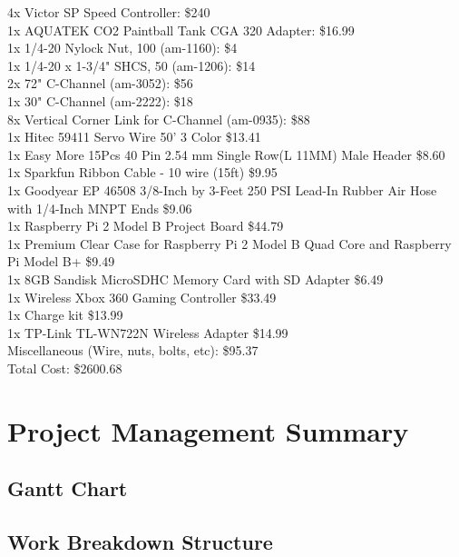 \documentclass[letterpaper,12pt]{article}
\begin{document}
4x Victor SP Speed Controller: \$240 \\
1x AQUATEK CO2 Paintball Tank CGA 320 Adapter: \$16.99 \\
1x 1/4-20 Nylock Nut, 100 (am-1160): \$4 \\
1x 1/4-20 x 1-3/4" SHCS, 50 (am-1206): \$14 \\
2x 72" C-Channel (am-3052): \$56 \\
1x 30" C-Channel (am-2222): \$18 \\
8x Vertical Corner Link for C-Channel (am-0935): \$88 \\
1x Hitec 59411 Servo Wire 50' 3 Color \$13.41 \\
1x Easy More 15Pcs 40 Pin 2.54 mm Single Row(L 11MM) Male Header \$8.60 \\
1x Sparkfun Ribbon Cable - 10 wire (15ft) \$9.95 \\
1x Goodyear EP 46508 3/8-Inch by 3-Feet 250 PSI Lead-In Rubber Air Hose with 1/4-Inch MNPT Ends \$9.06 \\
1x Raspberry Pi 2 Model B Project Board	\$44.79 \\
1x Premium Clear Case for Raspberry Pi 2 Model B Quad Core and Raspberry Pi Model B+ \$9.49 \\
1x 8GB Sandisk MicroSDHC Memory Card with SD Adapter	\$6.49 \\
1x Wireless Xbox 360 Gaming Controller \$33.49 \\
1x Charge kit \$13.99 \\
1x TP-Link TL-WN722N Wireless Adapter \$14.99 \\

Miscellaneous (Wire, nuts, bolts, etc): \$95.37 \\

Total Cost: \$2600.68

\pagebreak

\section{Project Management Summary}
\label{sec:projman}

\subsection{Gantt Chart}



\subsection{Work Breakdown Structure}

\end{document}
